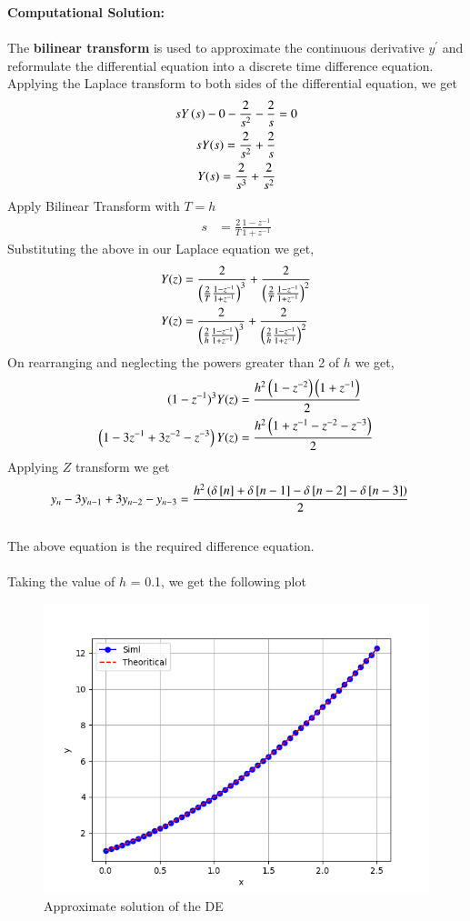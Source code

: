 \documentclass[journal]{IEEEtran}
\begin{document}
\textbf{Computational Solution: }\\ \\
The \textbf{ bilinear transform} is used to approximate the continuous derivative $y^{\prime}$ and reformulate the differential equation into a discrete time difference equation.\\
Applying the Laplace transform to both sides of the differential equation, we get
\begin{align}
sY\left(s\right) - 0 - \frac{2}{s^2} - \frac{2}{s} &= 0\\
sY(s) =  \frac{2}{s^2} + \frac{2}{s}\\
Y(s) =  \frac{2}{s^3} + \frac{2}{s^2}
\end{align}
Apply Bilinear Transform with $T=h$
\begin{align}
    s&=\frac{2}{T}\frac{1-z^{-1}}{1+z^{-1}}
\end{align}
Substituting the above in our Laplace equation we get,
\begin{align}
    Y(z) &= \frac{2}{\left(\frac{2}{T}\frac{1-z^{-1}}{1+z^{-1}}\right)^3} + \frac{2}{\left(\frac{2}{T}\frac{1-z^{-1}}{1+z^{-1}}\right)^2} \\ 
    Y(z) &= \frac{2}{\left(\frac{2}{h}\frac{1-z^{-1}}{1+z^{-1}}\right)^3} + \frac{2}{\left(\frac{2}{h}\frac{1-z^{-1}}{1+z^{-1}}\right)^2}
\end{align}
On rearranging and neglecting the powers greater than 2 of $h$ we get,
\begin{align}
    (1 - z^{-1})^3Y(z) &= \frac{h^2\left(1 - z^{-2}\right)\left(1 + z^{-1}\right)}{2} \\
    \left(1 - 3z^{-1} + 3z^{-2} - z^{-3}\right)Y(z) &= \frac{h^2\left(1 + z^{-1} - z^{-2} - z^{-3}\right)}{2}
\end{align}
Applying $Z$ transform we get
\begin{align}
    y_n - 3y_{n-1} + 3y_{n-2} - y_{n-3} &= \frac{h^2 \left(\delta{}\left[n\right]+\delta{}\left[n-1\right]-\delta{}\left[n-2\right]-\delta{}\left[n-3\right]\right)}{2}
\end{align}
\\The above equation is the required difference equation.\\ \\
Taking the value of $h$ = 0.1, we get the following plot

\begin{figure}[h!]
   \centering
   \includegraphics[width=0.7\columnwidth]{figs/fig.png}
    \caption{Approximate solution of the DE}
\end{figure}
\end{document}

